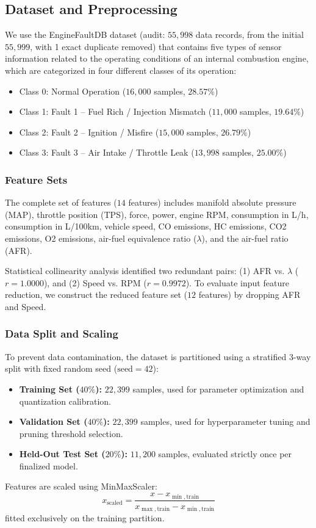 \documentclass[journal,10pt]{IEEEtran}
\begin{document}
\subsection{Dataset and Preprocessing}
We use the EngineFaultDB dataset (audit: $55,998$ data records, from the initial $55,999$, with 1 exact duplicate removed) that contains five types of sensor information related to the operating conditions of an internal combustion engine, which are categorized in four different classes of its operation:
\begin{itemize}
    \item Class 0: Normal Operation ($16,000$ samples, $28.57\%$)
    \item Class 1: Fault 1 -- Fuel Rich / Injection Mismatch ($11,000$ samples, $19.64\%$)
    \item Class 2: Fault 2 -- Ignition / Misfire ($15,000$ samples, $26.79\%$)
    \item Class 3: Fault 3 -- Air Intake / Throttle Leak ($13,998$ samples, $25.00\%$)
\end{itemize}

\subsubsection{Feature Sets}
The complete set of features ($14$ features) includes manifold absolute pressure (MAP), throttle position (TPS), force, power, engine RPM, consumption in L/h, consumption in L/100km, vehicle speed, CO emissions, HC emissions, CO2 emissions, O2 emissions, air-fuel equivalence ratio ($\lambda$), and the air-fuel ratio (AFR).

Statistical collinearity analysis identified two redundant pairs: (1) AFR vs. $\lambda$ ($r = 1.0000$), and (2) Speed vs. RPM ($r = 0.9972$). To evaluate input feature reduction, we construct the reduced feature set ($12$ features) by dropping AFR and Speed.

\subsubsection{Data Split and Scaling}
To prevent data contamination, the dataset is partitioned using a stratified 3-way split with fixed random seed ($\text{seed}=42$):
\begin{itemize}
    \item \textbf{Training Set ($40\%$):} $22,399$ samples, used for parameter optimization and quantization calibration.
    \item \textbf{Validation Set ($40\%$):} $22,399$ samples, used for hyperparameter tuning and pruning threshold selection.
    \item \textbf{Held-Out Test Set ($20\%$):} $11,200$ samples, evaluated strictly once per finalized model.
\end{itemize}
Features are scaled using MinMaxScaler:
\begin{equation}
    x_{\text{scaled}} = \frac{x - x_{\min,\text{train}}}{x_{\max,\text{train}} - x_{\min,\text{train}}}
\end{equation}
fitted exclusively on the training partition.
\end{document}
